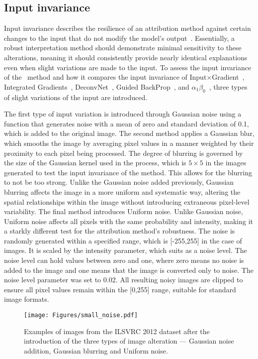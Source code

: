 \subsection{Input invariance}
\label{input_inv}
Input invariance describes the resilience of an attribution method against certain changes to the input that do not modify the model's output~\cite{YehHSIR19}. Essentially, a robust interpretation method should demonstrate minimal sensitivity to these alterations, meaning it should consistently provide nearly identical explanations even when slight variations are made to the input. To assess the input invariance of the \CTC\ method and how it compares the input invariance of Input$\times$Gradient~\cite{SimonyanVZ13}, Integrated Gradients~\cite{SundararajanTY17}, DeconvNet~\cite{ZeilerKTF10}, Guided BackProp~\cite{SpringenbergDBR14}, and \LRP\-$\alpha_1\beta_0$~\cite{bach2015pixel}, three types of slight variations of the input are introduced.


The first type of input variation is introduced through Gaussian noise using a function that generates noise with a mean of zero and standard deviation of 0.1, which is added to the original image. The second method applies a Gaussian blur, which smooths the image by averaging pixel values in a manner weighted by their proximity to each pixel being processed. The degree of blurring is governed by the size of the Gaussian kernel used in the process, which is $5 \times 5$ in the images generated to test the input invariance of the method. This allows for the blurring to not be too strong. Unlike the Gaussian noise added previously, Gaussian blurring affects the image in a more uniform and systematic way, altering the spatial relationships within the image without introducing extraneous pixel-level variability. The final method introduces Uniform noise. Unlike Gaussian noise, Uniform noise affects all pixels with the same probability and intensity, making it a starkly different test for the attribution method's robustness. The noise is randomly generated within a specified range, which is [-255,255] in the case of images. It is scaled by the intensity parameter, which suits as a noise level. The noise level can hold values between zero and one, where zero means no noise is added to the image and one means that the image is converted only to noise. The noise level parameter was set to 0.02. All resulting noisy images are clipped to ensure all pixel values remain within the [0,255] range, suitable for standard image formats.

\begin{figure}[ht!]
	\begin{center}
		\texttt{[image: Figures/small\_noise.pdf]}
	\end{center}
	\caption{Examples of images from the ILSVRC 2012 dataset after the introduction of the three types of image alteration --- Gaussian noise addition, Gaussian blurring and Uniform noise.}
	\label{Fig:noisy_images}
\end{figure} 

